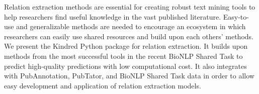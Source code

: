 Relation extraction methods are essential for creating robust text mining tools to help researchers find useful knowledge in the vast published literature. Easy-to-use and generalizable methods are needed to encourage an ecosystem in which researchers can easily use shared resources and build upon each others' methods. We present the Kindred Python package for relation extraction. It builds upon methods from the most successful tools in the recent BioNLP Shared Task to predict high-quality predictions with low computational cost. It also integrates with PubAnnotation, PubTator, and BioNLP Shared Task data in order to allow easy development and application of relation extraction models.

